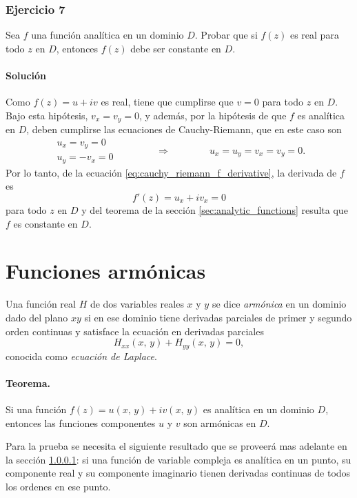 \documentclass[a4paper]{report}
\begin{document}
\subsubsection{Ejercicio 7}

Sea \(f\) una función analítica en un dominio \(D\). Probar que si \(f(z)\) es real para todo \(z\) en \(D\), entonces \(f(z)\) debe ser constante en \(D\).

\paragraph{Solución} Como \(f(z)=u+iv\) es real, tiene que cumplirse que \(v=0\) para todo \(z\) en \(D\). Bajo esta hipótesis, \(v_x=v_y=0\), y además, por la hipótesis de que \(f\) es analítica en \(D\), deben cumplirse las ecuaciones de Cauchy-Riemann, que en este caso son
\[
 \begin{array}{l}
  u_x=v_y=0\\
  u_y=-v_x=0
 \end{array}
 \qquad\qquad\Rightarrow\qquad\qquad
 u_x=u_y=v_x=v_y=0.
\]
Por lo tanto, de la ecuación \ref{eq:cauchy_riemann_f_derivative}, la derivada de \(f\) es
\[
 f'(z)=u_x+iv_x=0
\]
para todo \(z\) en \(D\) y del teorema de la sección \ref{sec:analytic_functions} resulta que \(f\) es constante en \(D\).

\section{Funciones armónicas}

Una función real \(H\) de dos variables reales \(x\) y \(y\) se dice \emph{armónica} en un dominio dado del plano \(xy\) si en ese dominio tiene derivadas parciales de primer y segundo orden continuas y satisface la ecuación en derivadas parciales
\[
 H_{xx}(x,\,y)+H_{yy}(x,\,y)=0,
\]
conocida como \emph{ecuación de Laplace}.

\paragraph{Teorema.} Si una función \(f(z)=u(x,\,y)+iv(x,\,y)\) es analítica en un dominio \(D\), entonces las funciones componentes \(u\) y \(v\) son armónicas en \(D\). 

Para la prueba se necesita el siguiente resultado que se proveerá mas adelante en la sección \ref{}: si una función de variable compleja es analítica en un punto, su componente real y su componente imaginario tienen derivadas continuas de todos los ordenes en ese punto. 
\end{document}

